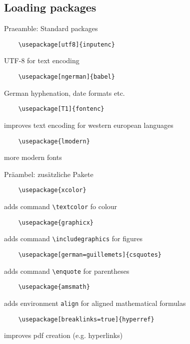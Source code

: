 \subsection{Loading packages}

\begin{frame}[fragile]{Praeamble: Standard packages}
  
  \begin{lstlisting}
    \usepackage[utf8]{inputenc}
  \end{lstlisting}
  UTF-8 for text encoding
  
  \begin{lstlisting}
    \usepackage[ngerman]{babel}
  \end{lstlisting}
  German hyphenation, date formats etc.
  
  \begin{lstlisting}
    \usepackage[T1]{fontenc}
  \end{lstlisting}
  improves text encoding for western european languages
  
  \begin{lstlisting}
    \usepackage{lmodern}
  \end{lstlisting}
  more modern fonts
\end{frame}

\begin{frame}[fragile]{Präambel: zusätzliche Pakete}

  \begin{lstlisting}
    \usepackage{xcolor}
  \end{lstlisting}
  adds command \lstinline-\textcolor- fo colour

  \begin{lstlisting}
    \usepackage{graphicx}  
  \end{lstlisting}
  adds command \lstinline-\includegraphics- for figures

  \begin{lstlisting}
    \usepackage[german=guillemets]{csquotes}
  \end{lstlisting}
  adds command \lstinline-\enquote- for parentheses

  \begin{lstlisting}
    \usepackage{amsmath}
  \end{lstlisting}
  adds environment \lstinline-align- for aligned mathematical formulas

  \begin{lstlisting}
    \usepackage[breaklinks=true]{hyperref}
  \end{lstlisting}
  improves pdf creation (e.g. hyperlinks)
\end{frame}
